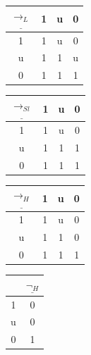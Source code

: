 \documentclass[11pt,a4paper,titlepage]{article}
\theoremstyle{definition}
\newcommand{\3}{\vspace{.3in}}
\newcommand{\2}{\vspace{.2in}}
\newcommand{\1}{\vspace{.1in}}
\newcommand{\5}{\vspace{.05in}}
\begin{document}
\begin{center}
	\begin{tabular}{|c|ccc|}
		\hline
		$\underline{\rightarrow_L} $ & 1 & u & 0 \\
		\hline
		1 & 1 & u & 0 \\
		u & 1 & 1 & u \\
		0 & 1 & 1 & 1 \\
		\hline
	\end{tabular}
	\begin{tabular}{|c|ccc|}
		\hline $\underline{\rightarrow_{Sl}} $ & 1 & u & 0\\\hline
		1 & 1 & u & 0 \\
		u & 1 & 1 & 1 \\
		0 & 1 & 1 & 1 \\	\hline
	\end{tabular}
	\begin{tabular}{|c|ccc|}
		\hline $\underline{\rightarrow_H} $ & 1 & u & 0\\\hline
		1 & 1 & u & 0 \\
		u & 1 & 1 & 0 \\
		0 & 1 & 1 & 1 \\	\hline
	\end{tabular}
	\begin{tabular}{|c|c|}
		\hline  & $\underline{\neg_H} $\\\hline
		1 & 0\\
		u & 0 \\
		0 & 1 \\\hline
	\end{tabular}
	\end{center} 
\end{document}

